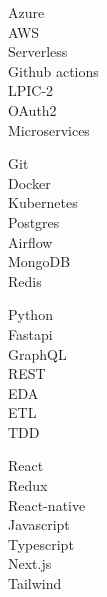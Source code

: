 \vspace{0.2cm}


\begin{minipage}[t]{0.24\textwidth}
    \Large
    \vspace{-\baselineskip}
    \faCircle \; {Azure}\\
    \faCircle \; {AWS}\\
    \faCircle \; {Serverless}\\
    \faCircle \; {Github actions}\\
    \faCircle \; {LPIC-2}\\
    \faCircle \; {OAuth2}\\
    \faCircle \; {Microservices}\\

\end{minipage}
\begin{minipage}[t]{0.25\textwidth}
    \Large
    \vspace{-\baselineskip}
    \faCircle \; {Git}\\
    \faCircle \; {Docker}\\
    \faCircle \; {Kubernetes}\\
    \faCircle \; {Postgres}\\
    \faCircle \; {Airflow}\\
    \faCircle \; {MongoDB}\\
    \faCircle \; {Redis}\\
\end{minipage}
\begin{minipage}[t]{0.25\textwidth}
    \Large
    \vspace{-\baselineskip}
    \faCircle \; {Python}\\
    \faCircle \; {Fastapi}\\
    \faCircle \; {GraphQL}\\
    \faCircle \; {REST}\\
    \faCircle \; {EDA}\\
    \faCircle \; {ETL}\\
    \faCircle \; {TDD}\\

\end{minipage}
\begin{minipage}[t]{0.25\textwidth}
    \Large
    \vspace{-\baselineskip}
    \faCircle \; {React}\\
    \faCircle \; {Redux}\\
    \faCircle \; {React-native}\\
    \faCircle \; {Javascript}\\
    \faCircle \; {Typescript}\\
    \faCircle \; {Next.js}\\
    \faCircle \; {Tailwind}\\
\end{minipage}